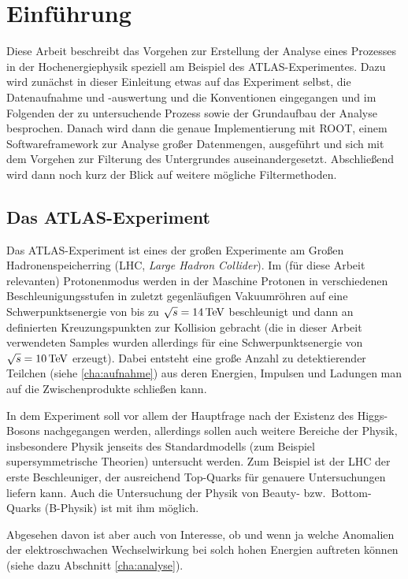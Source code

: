 \section{Einführung}
Diese Arbeit beschreibt das Vorgehen zur Erstellung der Analyse eines Prozesses
in der Hochenergiephysik speziell am Beispiel des ATLAS-Experimentes. Dazu wird
zunächst in dieser Einleitung etwas auf das Experiment selbst, die Datenaufnahme
und -auswertung und die Konventionen eingegangen und im Folgenden der zu
untersuchende Prozess sowie der Grundaufbau der Analyse besprochen.  Danach wird
dann die genaue Implementierung mit ROOT, einem Softwareframework zur Analyse
großer Datenmengen, ausgeführt und sich mit dem Vorgehen zur Filterung des
Untergrundes auseinandergesetzt. Abschließend wird dann noch kurz der Blick auf
weitere mögliche Filtermethoden.

\subsection{Das ATLAS-Experiment}
Das ATLAS-Experiment ist eines der großen Experimente am Großen
Hadronenspeicherring (LHC, \emph{Large Hadron Collider}). Im (für diese Arbeit
relevanten) Protonenmodus werden in der Maschine Protonen in verschiedenen
Beschleunigungsstufen in zuletzt gegenläufigen Vakuumröhren auf eine
Schwerpunktsenergie von bis zu $\sqrt{s} = \unit[14]{TeV}$ beschleunigt und dann
an definierten Kreuzungspunkten zur Kollision gebracht (die in dieser Arbeit
verwendeten Samples wurden allerdings für eine Schwerpunktsenergie von $\sqrt s
= \unit[10]{TeV}$ erzeugt). Dabei entsteht eine große Anzahl zu detektierender
Teilchen (siehe \ref{cha:aufnahme}) aus deren Energien, Impulsen und Ladungen
man auf die Zwischenprodukte schließen kann.

In dem Experiment soll vor allem der Hauptfrage nach der Existenz des
Higgs-Bosons nachgegangen werden, allerdings sollen auch weitere Bereiche der
Physik, insbesondere Physik jenseits des Standardmodells (zum Beispiel
supersymmetrische Theorien) untersucht werden. Zum Beispiel ist der LHC der
erste Beschleuniger, der ausreichend Top-Quarks für genauere Untersuchungen
liefern kann. Auch die Untersuchung der Physik von Beauty- bzw.\ Bottom-Quarks
(B-Physik) ist mit ihm möglich.

Abgesehen davon ist aber auch von Interesse, ob und wenn ja welche Anomalien der
elektroschwachen Wechselwirkung bei solch hohen Energien auftreten können (siehe
dazu Abschnitt \ref{cha:analyse}).

